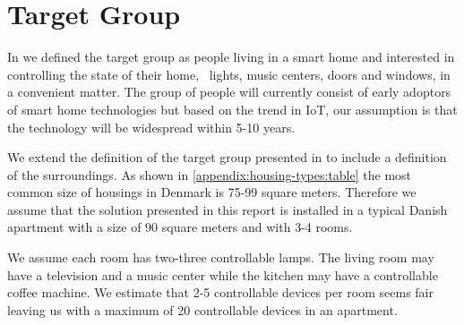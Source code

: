\section{Target Group}
\label{sec:target-group}

In \cite[p. 15]{prespecialisation} we defined the target group as people living in a smart home and interested in controlling the state of their home, \eg~lights, music centers, doors and windows, in a convenient matter. The group of people will currently consist of early adoptors of smart home technologies but based on the trend in IoT, our assumption is that the technology will be widespread within 5-10 years. 

We extend the definition of the target group presented in \cite[p. 15]{prespecialisation} to include a definition of the surroundings. As shown in \cref{appendix:housing-types:table} the most common size of housings in Denmark is 75-99 square meters. Therefore we assume that the solution presented in this report is installed in a typical Danish apartment with a size of 90 square meters and with 3-4 rooms. 

We assume each room has two-three controllable lamps. The living room may have a television and a music center while the kitchen may have a controllable coffee machine. We estimate that 2-5 controllable devices per room seems fair leaving us with a maximum of 20 controllable devices in an apartment.

